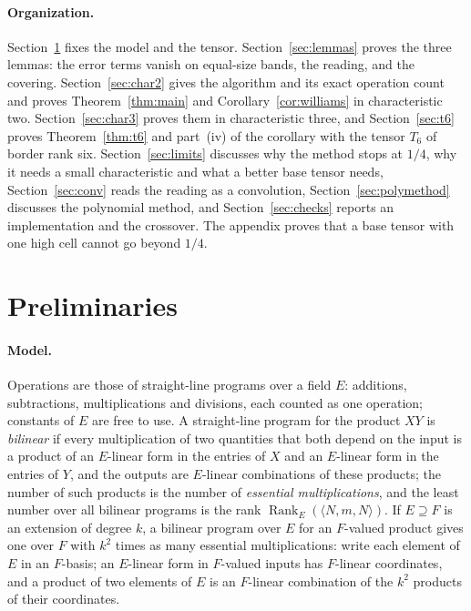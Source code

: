 \documentclass[11pt]{article}
\theoremstyle{definition}
\theoremstyle{remark}
\newcommand{\Rank}{\operatorname{Rank}}
\begin{document}
\paragraph{Organization.} Section~\ref{sec:prelim} fixes the model and the tensor. Section~\ref{sec:lemmas} proves the three lemmas: the error terms vanish on equal-size bands, the reading, and the covering. Section~\ref{sec:char2} gives the algorithm and its exact operation count and proves Theorem~\ref{thm:main} and Corollary~\ref{cor:williams} in characteristic two. Section~\ref{sec:char3} proves them in characteristic three, and Section~\ref{sec:t6} proves Theorem~\ref{thm:t6} and part~(iv) of the corollary with the tensor $T_6$ of border rank six. Section~\ref{sec:limits} discusses why the method stops at $1/4$, why it needs a small characteristic and what a better base tensor needs, Section~\ref{sec:conv} reads the reading as a convolution, Section~\ref{sec:polymethod} discusses the polynomial method, and Section~\ref{sec:checks} reports an implementation and the crossover. The appendix proves that a base tensor with one high cell cannot go beyond $1/4$.

\section{Preliminaries}\label{sec:prelim}

\paragraph{Model.} Operations are those of straight-line programs over a field $E$: additions, subtractions, multiplications and divisions, each counted as one operation; constants of $E$ are free to use. A straight-line program for the product $XY$ is \emph{bilinear} if every multiplication of two quantities that both depend on the input is a product of an $E$-linear form in the entries of $X$ and an $E$-linear form in the entries of $Y$, and the outputs are $E$-linear combinations of these products; the number of such products is the number of \emph{essential multiplications}, and the least number over all bilinear programs is the rank $\Rank_E(\langle N,m,N\rangle)$. If $E\supseteq F$ is an extension of degree $k$, a bilinear program over $E$ for an $F$-valued product gives one over $F$ with $k^2$ times as many essential multiplications: write each element of $E$ in an $F$-basis; an $E$-linear form in $F$-valued inputs has $F$-linear coordinates, and a product of two elements of $E$ is an $F$-linear combination of the $k^2$ products of their coordinates.
\end{document}
